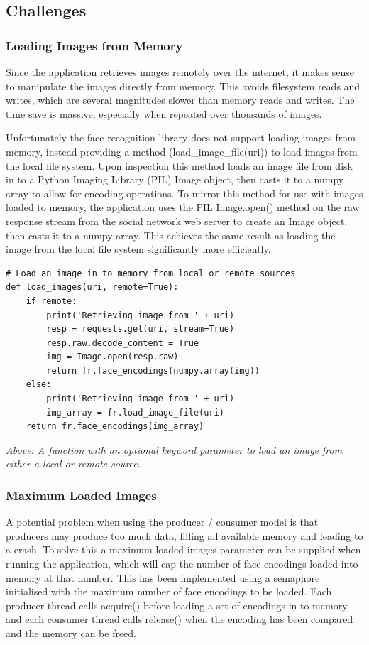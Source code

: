 \documentclass{article}
\begin{document}
\subsection{Challenges}
\subsubsection{Loading Images from Memory}
Since the application retrieves images remotely over the internet, it makes sense to manipulate the images directly from memory. This avoids filesystem reads and writes, which are several magnitudes slower than memory reads and writes. The time save is massive, especially when repeated over thousands of images.

Unfortunately the face recognition library does not support loading images from memory, instead providing a method (load\_image\_file(uri)) to load images from the local file system. Upon inspection this method loads an image file from disk in to a Python Imaging Library (PIL) Image object, then casts it to a numpy array to allow for encoding operations. To mirror this method for use with images loaded to memory, the application uses the PIL Image.open() method on the raw response stream from the social network web server to create an Image object, then casts it to a numpy array. This achieves the same result as loading the image from the local file system significantly more efficiently.

\begin{lstlisting}
# Load an image in to memory from local or remote sources
def load_images(uri, remote=True):
    if remote:
        print('Retrieving image from ' + uri)
        resp = requests.get(uri, stream=True)
        resp.raw.decode_content = True
        img = Image.open(resp.raw)
        return fr.face_encodings(numpy.array(img))
    else:
        print('Retrieving image from ' + uri)
        img_array = fr.load_image_file(uri)
    return fr.face_encodings(img_array)
\end{lstlisting}
\textit{Above: A function with an optional keyword parameter to load an image from either a local or remote source.}

\subsubsection{Maximum Loaded Images}
A potential problem when using the producer / consumer model is that producers may produce too much data, filling all available memory and leading to a crash. To solve this a maximum loaded images parameter can be supplied when running the application, which will cap the number of face encodings loaded into memory at that number. This has been implemented using a semaphore initialised with the maximum number of face encodings to be loaded. Each producer thread calls acquire() before loading a set of encodings in to memory, and each consumer thread calls release() when the encoding has been compared and the memory can be freed.
\end{document}
